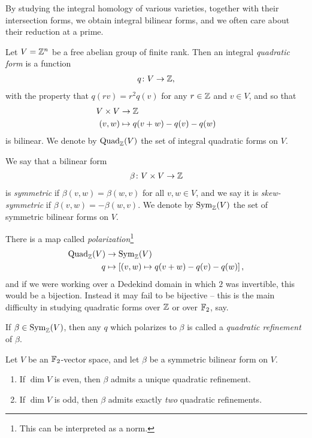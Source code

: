 \documentclass[11pt]{amsart}
\providecommand{\Quad}{\mathrm{Quad}}
\begin{document}
By studying the integral homology of various varieties, together with their intersection forms, we obtain integral bilinear forms, and we often care about their reduction at a prime.

\begin{definition}
Let $V = \mathbb{Z}^n$ be a free abelian group of finite rank. Then an integral \textit{quadratic form} is a function
\begin{align*}
    q \colon V \to \mathbb{Z},
\end{align*}
with the property that $q(rv) = r^2 q(v)$ for any $r\in \mathbb{Z}$ and $v\in V$, and so that
\begin{align*}
    V \times V &\to \mathbb{Z} \\
    (v,w) &\mapsto q(v+w)-q(v)-q(w)
\end{align*}
is bilinear. We denote by $\Quad_\Z(V)$ the set of integral quadratic forms on $V$.
\end{definition}



\begin{definition} We say that a bilinear form
\begin{align*}
    \beta \colon V \times V \to \mathbb{Z}
\end{align*}
is \textit{symmetric} if $\beta(v,w) = \beta(w,v)$ for all $v,w\in V$, and we say it is \textit{skew-symmetric} if $\beta(v,w) = - \beta(w,v)$. We denote by $\mathrm{Sym}_{\mathbb{Z}}(V)$ the set of symmetric bilinear forms on $V$.
\end{definition}

There is a map called \textit{polarization}\footnote{This can be interpreted as a norm.}
\begin{align*}
    \Quad_\Z(V) &\to \Sym_\Z(V) \\
    q &\mapsto \left[ (v,w) \mapsto q(v+w)-q(v)-q(w) \right],
\end{align*}
and if we were working over a Dedekind domain in which $2$ was invertible, this would be a bijection. Instead it may fail to be bijective -- this is the main difficulty in studying quadratic forms over $\mathbb{Z}$ or over $\mathbb{F}_2$, say.

\begin{terminology} If $\beta \in \mathrm{Sym}_{\mathbb{Z}}(V)$, then any $q$ which polarizes to $\beta$ is called a \textit{quadratic refinement} of $\beta$.
\end{terminology}


\begin{proposition} Let $V$ be an $\mathbb{F}_2$-vector space, and let $\beta$ be a symmetric bilinear form on $V$.
\begin{enumerate}
    \item If $\dim V$ is even, then $\beta$ admits a unique quadratic refinement.
    \item If $\dim V$ is odd, then $\beta$ admits exactly \textit{two} quadratic refinements.
\end{enumerate}
\end{proposition}





\end{document}
